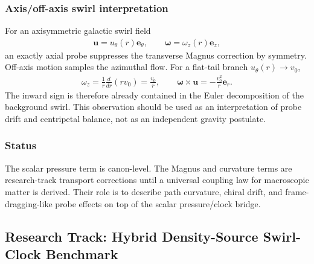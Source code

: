 \subsubsection{Axis/off-axis swirl interpretation}
    For an axisymmetric galactic swirl field
    \begin{align}
        \mathbf{u}=u_\theta(r)\mathbf{e}_\theta,
        \qquad
        \boldsymbol{\omega}=\omega_z(r)\mathbf{e}_z,
    \end{align}
    an exactly axial probe suppresses the transverse Magnus correction by symmetry.
    Off-axis motion samples the azimuthal flow. For a flat-tail branch
    \(u_\theta(r)\to v_0\),
    \begin{align}
        \omega_z
        =
        \frac{1}{r}\frac{d}{dr}\left(r v_0\right)
        =
        \frac{v_0}{r},
        \qquad
        \boldsymbol{\omega}\times\mathbf{u}
        =
        -\frac{v_0^2}{r}\mathbf{e}_r.
    \end{align}
    The inward sign is therefore already contained in the Euler decomposition of
    the background swirl. This observation should be used as an interpretation of
    probe drift and centripetal balance, not as an independent gravity postulate.

\subsubsection{Status}
    The scalar pressure term is canon-level. The Magnus and curvature terms are
    research-track transport corrections until a universal coupling law for
    macroscopic matter is derived. Their role is to describe path curvature,
    chiral drift, and frame-dragging-like probe effects on top of the scalar
    pressure/clock bridge.
    
    


\subsection{Research Track: Hybrid Density-Source Swirl-Clock Benchmark}
\label{app:research_hybrid_density_source_swirl_clock}

